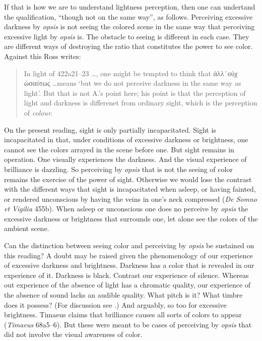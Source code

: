 If that is how we are to understand lightness perception, then one can undertand the qualification, ``though not on the same way'', as follows. Perceiving excessive darkness by \emph{opsis} is not seeing the colored scene in the same way that perceiving excessive light by \emph{opsis} is. The obstacle to seeing is different in each case. They are different ways of destroying the ratio that constitutes the power to see color. Against this Ross writes:
\begin{quote}
	In light of 422a21–23 \ldots, one might be tempted to think that {\sbl άλλ´ούχ ώσαύτως} \ldots means `but we do not perceive darkness in the same way as light'. But that is not A.'s point here; his point is that the perception of light and darkness is differenet from ordinary sight, which is the perception of \emph{colour}. \citep[275]{Ross:1961uq}
\end{quote}

On the present reading, sight is only partially incapacitated. Sight is incapacitated in that, under conditions of excessive darkness or brightness, one cannot see the colors arrayed in the scene before one. But sight remains in operation. One visually experiences the darkness. And the visual experience of brilliance is dazzling. So perceiving by \emph{opsis} that is not the seeing of color remains the exercise of the power of sight. Otherwise we would lose the contrast with the different ways that sight is incapacitated when asleep, or having fainted, or rendered unconscious by having the veins in one's neck compressed (\emph{De Somno et Vigilia} 455b). When asleep or unconscious one does no perceive by \emph{opsis} the excessive darkness or brightness that surrounds one, let alone see the colors of the ambient scene.

Can the distinction between seeing color and perceiving by \emph{opsis} be sustained on this reading? A doubt may be raised given the phenomenology of our experience of excessive darkness and brightness. Darkness has a color that is revealed in our experience of it. Darkness is black. Contrast our experience of silence. Whereas out experience of the absence of light has a chromatic quality, our experience of the absence of sound lacks an audible quality. What pitch is it? What timbre does it possess? (For discussion see \citealt{Sorensen:2008kx,Sorensen:2009aa}.) And arguably, so too for excessive brightness. Timaeus claims that brilliance causes all sorts of colors to appear (\emph{Timaeus} 68a5–6). But these were meant to be cases of perceiving by \emph{opsis} that did not involve the visual awareness of color.

